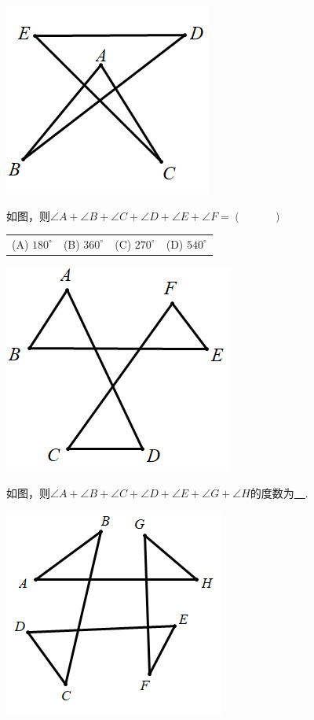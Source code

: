 \documentclass[10pt,twocolumn]{ctexart}
\newcommand{\onech}[4]{
\renewcommand\arraystretch{1.4}
\begin{tabularx}{\linewidth}{XXXX}
\setlength\tabcolsep{0pt}
(A) #1 & (B) #2 & (C) #3 & (D) #4 \\
\end{tabularx}
\unskip \unskip}
\begin{document}
 \includegraphics[scale=0.5]{figure/bazhi04.PNG}
\begin{shaded}
\begin{example}
如图，则$\angle A+\angle B+\angle C+\angle D+\angle E+\angle F=(~\hspace{1cm}~)$\\
\onech{$180^\circ$}{$360^\circ$}{$270^\circ$}{$540^\circ$}
\end{example}
\end{shaded}
 \includegraphics[scale=0.5]{figure/bazhi05.PNG}
\begin{shaded}
\begin{example}
如图，则$\angle A+\angle B+\angle C+\angle D+\angle E+\angle G+\angle H$的度数为\underline{~\hspace{1cm}~}.
\end{example}
\end{shaded}
 \includegraphics[scale=0.5]{figure/bazhi06.PNG}
\end{document}
